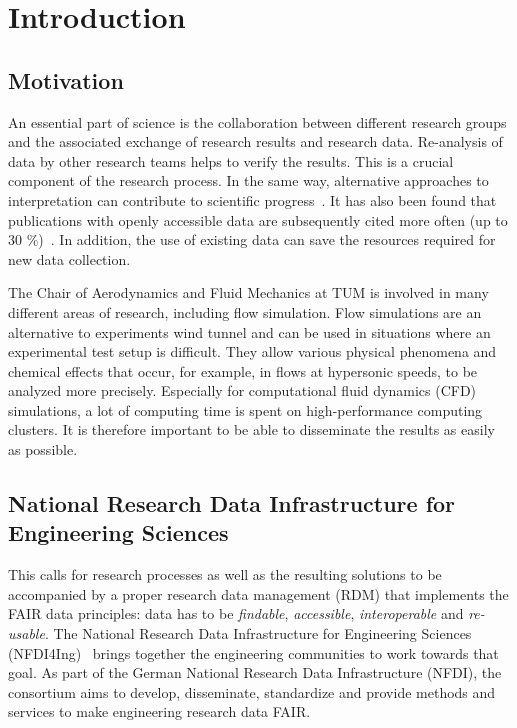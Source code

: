 
\chapter{Introduction}\label{chapter:introduction}

\section{Motivation}

An essential part of science is the collaboration between different research
groups and the associated exchange of research results and research data.
Re-analysis of data by other research teams helps to verify the results. This is
a crucial component of the research process. In the same way, alternative
approaches to interpretation can contribute to scientific
progress~\cite{tenopir2011data}. It has also been found that publications with
openly accessible data are subsequently cited more often (up to 30
\%)~\cite{piwowar2013data}. In addition, the use of existing data can save the
resources required for new data collection. 

The Chair of Aerodynamics and Fluid Mechanics at TUM is involved in many
different areas of research, including flow simulation. Flow simulations are an
alternative to experiments wind tunnel and can be used in situations where an
experimental test setup is difficult. They allow various physical phenomena and
chemical effects that occur, for example, in flows at hypersonic speeds, to be
analyzed more precisely. Especially for computational fluid dynamics (CFD)
simulations, a lot of computing time is spent on high-performance computing
clusters. It is therefore important to be able to disseminate the results as
easily as possible.

\section{National Research Data Infrastructure for Engineering Sciences}

This calls for research processes as well as the resulting solutions to be
accompanied by a proper research data management (RDM) that implements the FAIR
data principles: data has to be \textit{findable}, \textit{accessible},
\textit{interoperable} and \textit{re-usable}. The National Research Data
Infrastructure for Engineering Sciences (NFDI4Ing)~\cite{schmitt2020nfdi4ing}
brings together the engineering communities to work towards that goal. As part
of the German National Research Data Infrastructure (NFDI), the consortium aims
to develop, disseminate, standardize and provide methods and services to make
engineering research data FAIR. 

